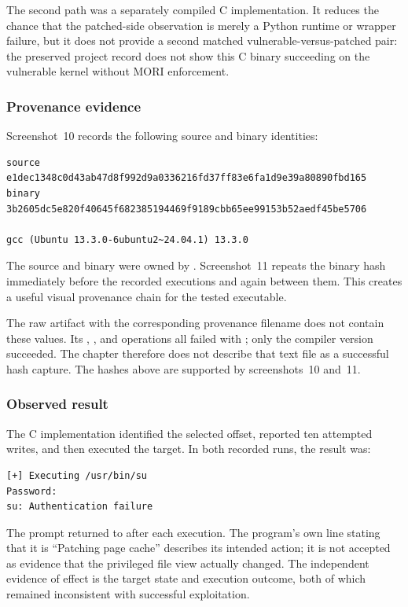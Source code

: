 The second path was a separately compiled C implementation. It reduces the
chance that the patched-side observation is merely a Python runtime or wrapper
failure, but it does not provide a second matched vulnerable-versus-patched
pair: the preserved project record does not show this C binary succeeding on
the vulnerable kernel without MORI enforcement.

\subsubsection{Provenance evidence}

Screenshot~10 records the following source and binary identities:

\begin{lstlisting}
source  e1dec1348c0d43ab47d8f992d9a0336216fd37ff83e6fa1d9e39a80890fbd165
binary  3b2605dc5e820f40645f682385194469f9189cbb65ee99153b52aedf45be5706

gcc (Ubuntu 13.3.0-6ubuntu2~24.04.1) 13.3.0
\end{lstlisting}

The source and binary were owned by . Screenshot~11 repeats the
binary hash immediately before the recorded executions and again between them.
This creates a useful visual provenance chain for the tested executable.

The raw artifact with the corresponding provenance filename does not contain
these values. Its , , and  operations
all failed with ; only the compiler version succeeded.
The chapter therefore does not describe that text file as a successful hash
capture. The hashes above are supported by screenshots~10 and~11.

\subsubsection{Observed result}

The C implementation identified the selected  offset,
reported ten attempted writes, and then executed the target. In both recorded
runs, the result was:

\begin{lstlisting}
[+] Executing /usr/bin/su
Password:
su: Authentication failure
\end{lstlisting}

The prompt returned to  after each execution. The program's own
line stating that it is ``Patching page cache'' describes its intended action;
it is not accepted as evidence that the privileged file view actually changed.
The independent evidence of effect is the target state and execution outcome,
both of which remained inconsistent with successful exploitation.

